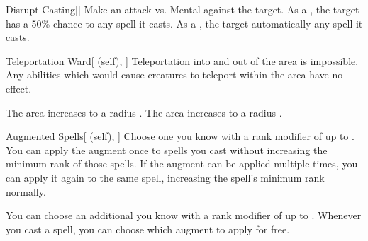\lowercase{\hypertarget{spell:Disrupt Casting}{}}\label{spell:Disrupt Casting}
\begin{freeability}[Rank 4]{\hypertarget{spell:Disrupt Casting}{Disrupt Casting}}[]
Make an attack vs. Mental against the target.
\hit As a , the target has a 50\% chance to  any spell it casts.
\crit As a , the target automatically  any spell it casts.
\end{freeability}
\vspace{0.25em}



\lowercase{\hypertarget{spell:Teleportation Ward}{}}\label{spell:Teleportation Ward}
\begin{attuneability}[Rank 4]{\hypertarget{spell:Teleportation Ward}{Teleportation Ward}}[ (self), ]
Teleportation into and out of the area is impossible.
Any abilities which would cause creatures to teleport within the area have no effect.

\rankline
{} The area increases to a \areahuge radius .
 The area increases to a \areaext radius .
\end{attuneability}
\vspace{0.25em}



\lowercase{\hypertarget{spell:Augmented Spells}{}}\label{spell:Augmented Spells}
\begin{attuneability}[Rank 5]{\hypertarget{spell:Augmented Spells}{Augmented Spells}}[ (self), ]
Choose one  you know with a rank modifier of up to .
You can apply the augment once to spells you cast without increasing the minimum rank of those spells.
If the augment can be applied multiple times, you can apply it again to the same spell, increasing the spell's minimum rank normally.

\rankline
{} You can choose an additional  you know with a rank modifier of up to .
Whenever you cast a spell, you can choose which augment to apply for free.
\end{attuneability}
\vspace{0.25em}



